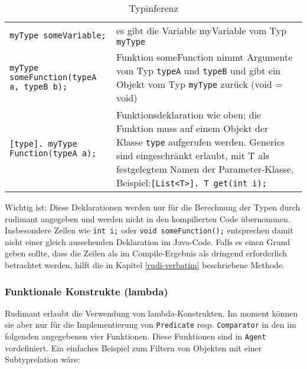 \begin{table}[htbp]
  \centering
  \small
  \begin{tabular}{lp{}}
    \texttt{myType someVariable;}
    &  es gibt die Variable myVariable vom Typ \texttt{myType} \\

    \texttt{myType someFunction(typeA a, typeB b);}
    &  Funktion someFunction nimmt Argumente vom Typ \texttt{typeA} und
      \texttt{typeB} und gibt ein Objekt vom Typ \texttt{myType} zurück (void =
      void) \\

    \texttt{[type]. myType Function(typeA a);}
    & Funktionsdeklaration wie oben; die Funktion muss auf einem Objekt der
      Klasse \texttt{type} aufgerufen werden. Generics sind eingeschränkt
      erlaubt, mit T als festgelegtem Namen der Parameter-Klasse,
      Beispiel:\newline\texttt{[List<T>]. T get(int i);}
  \end{tabular}

  \caption{Typinferenz}
  \label{tab:typeinference}
\end{table}

Wichtig ist: Diese Deklarationen werden nur für die Berechnung der Typen durch
rudimant angegeben und werden nicht in den kompilierten Code
übernommen. Insbesondere Zeilen wie \texttt{int i;} oder \texttt{void
  someFunction();} entsprechen damit nicht einer gleich aussehenden Deklaration
im Java-Code. Falls es einen Grund geben sollte, dass die Zeilen als im
Compile-Ergebnis als dringend erforderlich betrachtet werden, hilft die in
Kapitel \ref{rudi-verbatim} beschriebene Methode.


\subsubsection{Funktionale Konstrukte (lambda)}

Rudimant erlaubt die Verwendung von lambda-Konstrukten. Im moment können sie
aber nur für die Implementierung von \texttt{Predicate}
resp. \texttt{Comparator} in den im folgenden angegebenen vier
Funktionen. Diese Funktionen sind in \texttt{Agent} vordefiniert. Ein
einfaches Beispiel zum Filtern von Objekten mit einer Subtyprelation wäre:

